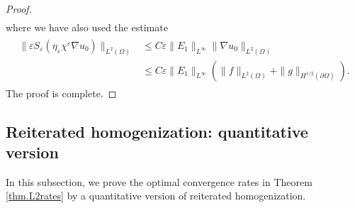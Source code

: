 \documentclass[reqno,12pt]{amsart} %
\newtheorem{theorem}{Theorem}[section]
\theoremstyle{definition}
\theoremstyle{remark}
\numberwithin{equation}{section}
\newcommand{\e}{\varepsilon}
\begin{document}
\begin{proof}
\begin{align*}
\end{align*}
where we have also used the estimate
\begin{align}\label{conver_es_Su0}
  \begin{split}
    \|\varepsilon S_\varepsilon(\eta_\varepsilon \chi^\varepsilon \nabla u_0)\|_{L^2(\Omega)}&\leq C\varepsilon \|E_1\|_{L^\infty}\|\nabla u_0\|_{L^2(\Omega)}\\&\leq C\varepsilon \|E_1\|_{L^\infty} (\|f\|_{L^2(\Omega)}+\|g\|_{H^{1/2}(\partial\Omega)}).
  \end{split}
\end{align}
The proof is complete. 
\end{proof}

\subsection{Reiterated homogenization: quantitative version}
In this subsection, we prove the optimal convergence rates in Theorem \ref{thm.L2rates} by a quantitative version of reiterated homogenization.


\end{document}
